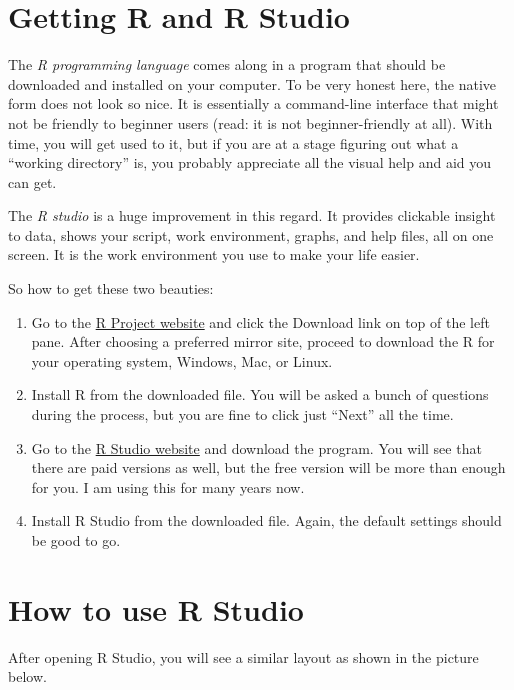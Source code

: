 \documentclass[]{book}
\begin{document}
\section{Getting R and R Studio}\label{getting-r-and-r-studio}

The \emph{R programming language} comes along in a program that should
be downloaded and installed on your computer. To be very honest here,
the native form does not look so nice. It is essentially a command-line
interface that might not be friendly to beginner users (read: it is not
beginner-friendly at all). With time, you will get used to it, but if
you are at a stage figuring out what a ``working directory'' is, you
probably appreciate all the visual help and aid you can get.

The \emph{R studio} is a huge improvement in this regard. It provides
clickable insight to data, shows your script, work environment, graphs,
and help files, all on one screen. It is the work environment you use to
make your life easier.

So how to get these two beauties:

\begin{enumerate}
\def\labelenumi{\arabic{enumi})}
\item
  Go to the \href{https://www.r-project.org/}{R Project website} and
  click the Download link on top of the left pane. After choosing a
  preferred mirror site, proceed to download the R for your operating
  system, Windows, Mac, or Linux.
\item
  Install R from the downloaded file. You will be asked a bunch of
  questions during the process, but you are fine to click just ``Next''
  all the time.
\item
  Go to the \href{https://rstudio.com/products/rstudio/download/}{R
  Studio website} and download the program. You will see that there are
  paid versions as well, but the free version will be more than enough
  for you. I am using this for many years now.
\item
  Install R Studio from the downloaded file. Again, the default settings
  should be good to go.
\end{enumerate}

\section{How to use R Studio}\label{how-to-use-r-studio}

After opening R Studio, you will see a similar layout as shown in the
picture below.
\end{document}
